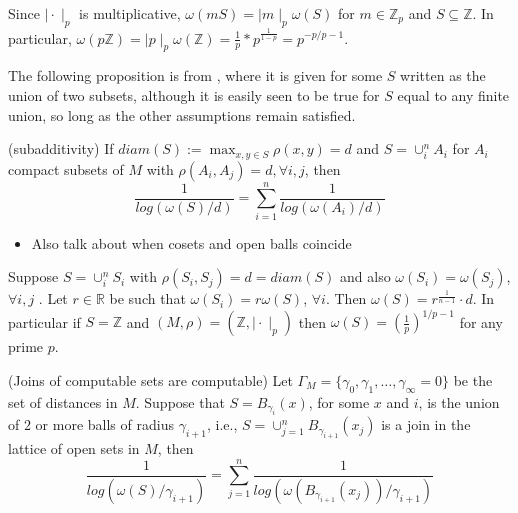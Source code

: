 \begin{example}
	Since $\mid \cdot \mid_p$ is multiplicative, $\omega(mS) = \mid m \mid_p  \omega(S)$ for $m \in \mathbb{Z}_p$ and $S \subseteq \mathbb{Z}$. In particular, $\omega(p\mathbb{Z}) = \mid p \mid_p \omega(\mathbb{Z}) = \frac{1}{p}*p^{\frac{1}{1-p}} = p^{-p/p-1}.$
\end{example}

The following proposition is from \cite{kj}, where it is given for some $S$  written as the union of two subsets, although it is easily seen to be true for $S$ equal to any finite union, so long as the other assumptions remain satisfied.

\begin{proposition*}
	\cite{kj}(subadditivity) If  $diam(S) := \max_{x,y \in S} \rho(x,y)=d$ and $S=\cup_i^n A_i$ for $A_i$ compact subsets of $M$ with $\rho(A_i, A_j)=d, \forall i,j$, then \[\frac{1}{log(\omega(S)/d) } = \sum_{i=1}^n \frac{1}{log(\omega(A_i)/d)}\] 
\end{proposition*}


\begin{example}

\end{example}

\begin{itemize}
\item Also talk about when cosets and open balls coincide 
\end{itemize}

\begin{corollary*}
	Suppose $S = \cup_i^n S_i$ with $\rho(S_i, S_j)=d=diam(S)$ and also $\omega(S_i)=\omega(S_j)$, $\forall i,j$ .  Let $r \in \mathbb{R}$ be such that $\omega(S_i)=r\omega(S)$, $\forall i$. Then $\omega(S) = r^{\frac{1}{n-1}}\cdot d$. In particular if $S = \mathbb{Z}$ and $(M,\rho)= (\mathbb{Z}, \mid \cdot\mid_p)$ then $\omega(S)=(\frac{1}{p})^{1/p-1}$ for any prime $p$. 
\end{corollary*}

\begin{corollary*}
	(Joins of computable sets are computable) Let  $\Gamma_M = \{\gamma_0, \gamma_1,\ldots, \gamma_\infty=0\}$ be the set of distances in $M$. Suppose that $S = B_{\gamma_i}(x)$,  for some $x$ and $i$, is the union of $2$ or more balls of radius $\gamma_{i+1}$, i.e., $S=\cup_{j=1}^n B_{\gamma_{i+1}} (x_j)$ is a join in the lattice of open sets in $M$, then 
	\[\frac{1}{log(\omega(S)/\gamma_{i+1} )} = \sum_{j=1}^n \frac{1}{log(\omega(B_{\gamma_{i+1}}(x_j))/\gamma_{i+1} )}\]
\end{corollary*}

